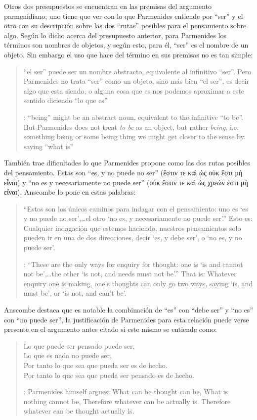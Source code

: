 Otros dos presupuestos se encuentran en las premisas del argumento parmenidiano; uno tiene que ver con lo que Parmenides entiende por \enquote{ser} y el otro con su descripción sobre las dos \enquote{rutas} posibles para el pensamiento sobre algo. Según lo dicho acerca del presupuesto anterior, para Parmenides los términos son nombres de objetos, y según esto, para él, \enquote{ser} es el nombre de un objeto. Sin embargo el uso que hace del término en sus premisas no es tan simple: \blockquote[{\cite[x]{anscombe1981parmenides}}: ``being'' might be an abstract noun, equivalent to the infinitive ``to be''. But Parmenides does not treat \emph{to be} as an object, but rather \emph{being}, i.e. something being or some being thing \textelp{} we might get closer to the sense by saying ``what is'']{``el ser'' puede ser un nombre abstracto, equivalente al infinitivo ``ser''. Pero Parmenides no trata ``ser'' como un objeto, sino más bien ``el ser'', es decir algo que esta siendo, o alguna cosa que es \textelp{} nos podemos aproximar a este sentido diciendo ``lo que es''}. También trae dificultades lo que Parmenides propone como las dos rutas posibles del pensamiento. Estas son \enquote{es, y no puede no ser} (\textgreek{ἔστιν τε καὶ ὡς οὐκ ἔστι μὴ εἶναι}) y \enquote{no es y necesariamente no puede ser} (\textgreek{οὐκ ἔστιν τε καὶ ὡς χρεών ἐστι μὴ εἶναι}). Anscombe lo pone en estas palabras: \blockquote[{\cite[x]{anscombe1981parmenides}}: ``These are the only ways for enquiry for thought: one is `is and cannot not be',\ldots the other `is not, and needs must not be'.'' That is: Whatever enquiry one is making, one's thoughts can only go two ways, saying `is, and must be', or `is not, and can't be'.]{``Estos son los únicos caminos para indagar con el pensamiento: uno es `es y no puede no ser',\ldots el otro `no es, y necesariamente no puede ser'.'' Esto es: Cualquier indagación que estemos haciendo, nuestros pensamientos solo pueden ir en una de dos direcciones, decir `es, y debe ser', o `no es, y no puede ser'.} Anscombe destaca que es notable la combinación de \enquote{es} con \enquote{debe ser}  y \enquote{no es} con \enquote{no puede ser}, la justificación de Parmenides para esta relación puede verse presente en el argumento antes citado si este mismo se entiende como: \blockquote[{\cite[vii]{anscombe1981parmenides}}: Parmenides himself argues: What can be thought can be, What is nothing cannot be, Therefore whatever can be actually is. Therefore whatever can be thought actually is.]{Lo que puede ser pensado puede ser,\\
Lo que es nada no puede ser,\\
Por tanto lo que sea que pueda ser es de hecho.\\
Por tanto lo que sea que pueda ser pensado es de hecho.}

